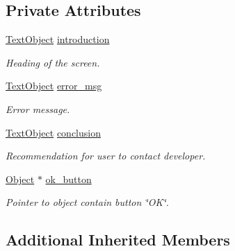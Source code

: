 \subsection*{Private Attributes}
\begin{DoxyCompactItemize}
\item 
\mbox{\label{class_error_window_af19cefec0afdefc61a143fbba66a293b}} 
\hyperlink{class_text_object}{Text\+Object} \hyperlink{class_error_window_af19cefec0afdefc61a143fbba66a293b}{introduction}
\begin{DoxyCompactList}\small\item\em Heading of the screen. \end{DoxyCompactList}\item 
\mbox{\label{class_error_window_ad282b1abbf57a6c004b1ccfa48355f49}} 
\hyperlink{class_text_object}{Text\+Object} \hyperlink{class_error_window_ad282b1abbf57a6c004b1ccfa48355f49}{error\+\_\+msg}
\begin{DoxyCompactList}\small\item\em Error message. \end{DoxyCompactList}\item 
\mbox{\label{class_error_window_a0f1580b68d4e10e07b4cd7d03a6431c4}} 
\hyperlink{class_text_object}{Text\+Object} \hyperlink{class_error_window_a0f1580b68d4e10e07b4cd7d03a6431c4}{conclusion}
\begin{DoxyCompactList}\small\item\em Recommendation for user to contact developer. \end{DoxyCompactList}\item 
\mbox{\label{class_error_window_aa155c8753f726ace716eabca851255dc}} 
\hyperlink{class_object}{Object} $\ast$ \hyperlink{class_error_window_aa155c8753f726ace716eabca851255dc}{ok\+\_\+button}
\begin{DoxyCompactList}\small\item\em Pointer to object contain button \char`\"{}\+O\+K\char`\"{}. \end{DoxyCompactList}\end{DoxyCompactItemize}
\subsection*{Additional Inherited Members}


